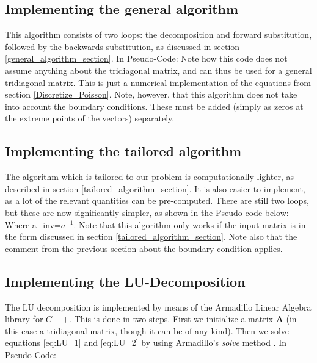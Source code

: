 \documentclass[a4paper, 10pt]{article}
\begin{document}
\subsection{Implementing the general algorithm}
This algorithm consists of two loops: the decomposition and forward substitution, followed by the backwards substitution, as discussed in section \ref{general_algorithm_section}. In Pseudo-Code:
%
Note how this code does not assume anything about the tridiagonal matrix, and can thus be used for a general tridiagonal matrix. This is just a numerical implementation of the equations from section \ref{Discretize_Poisson}. Note, however, that this algorithm does not take into account the boundary conditions. These must be added (simply as zeros at the extreme points of the vectors) separately. 
\subsection{Implementing the tailored algorithm}
The algorithm which is tailored to our problem is computationally lighter, as described in section \ref{tailored_algorithm_section}. It is also easier to implement, as a lot of the relevant quantities can be pre-computed. There are still two loops, but these are now significantly simpler, as shown in the Pseudo-code below:
% 
Where a\_inv=$a^{-1}$. Note that this algorithm only works if the input matrix is in the form discussed in section \ref{tailored_algorithm_section}. Note also that the comment from the previous section about the boundary condition applies.
\subsection{Implementing the LU-Decomposition}
The LU decomposition is implemented by means of the Armadillo Linear Algebra library for $C++$. This is done in two steps. First we initialize a matrix $\mathbf{A}$ (in this case a tridiagonal matrix, though it can be of any kind). Then we solve equations \ref{eq:LU_1} and \ref{eq:LU_2} by using Armadillo's \textit{solve} method . In Pseudo-Code:
% 
\end{document}
